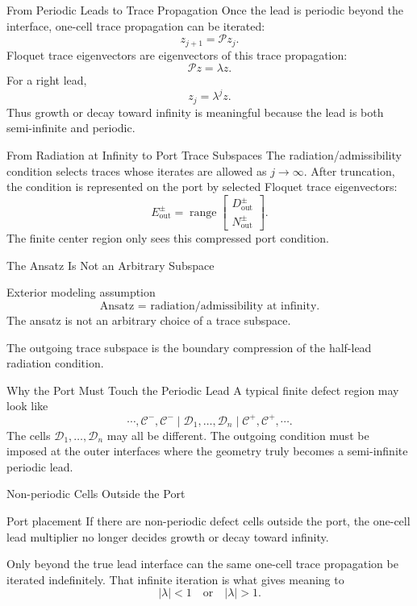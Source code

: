 \documentclass[aspectratio=169]{beamer}
\begin{document}
\begin{frame}{From Periodic Leads to Trace Propagation}
  Once the lead is periodic beyond the interface, one-cell trace propagation can be iterated:
  \[
    z_{j+1}=\mathcal P z_j.
  \]
  Floquet trace eigenvectors are eigenvectors of this trace propagation:
  \[
    \mathcal P z=\lambda z.
  \]
  For a right lead,
  \[
    z_j=\lambda^j z.
  \]
  Thus growth or decay toward infinity is meaningful because the lead is both semi-infinite and periodic.
\end{frame}

\begin{frame}{From Radiation at Infinity to Port Trace Subspaces}
  The radiation/admissibility condition selects traces whose iterates are allowed as \(j\to\infty\).
  After truncation, the condition is represented on the port by selected Floquet trace eigenvectors:
  \[
    E_{\mathrm{out}}^\pm
    =
    \operatorname{range}
    \begin{bmatrix}
      D_{\mathrm{out}}^\pm\\
      N_{\mathrm{out}}^\pm
    \end{bmatrix}.
  \]
  The finite center region only sees this compressed port condition.
\end{frame}

\begin{frame}{The Ansatz Is Not an Arbitrary Subspace}
  \begin{alertblock}{Exterior modeling assumption}
    \[
      \boxed{\text{Ansatz = radiation/admissibility at infinity.}}
    \]
    The ansatz is not an arbitrary choice of a trace subspace.
  \end{alertblock}
  The outgoing trace subspace is the boundary compression of the half-lead radiation condition.
\end{frame}

\begin{frame}{Why the Port Must Touch the Periodic Lead}
  A typical finite defect region may look like
  \[
    \cdots,\mathcal C^-,\mathcal C^-
    \mid
    \mathcal D_1,\ldots,\mathcal D_n
    \mid
    \mathcal C^+,\mathcal C^+,\cdots .
  \]
  The cells \(\mathcal D_1,\ldots,\mathcal D_n\) may all be different.
  The outgoing condition must be imposed at the outer interfaces where the geometry truly becomes a semi-infinite periodic lead.
\end{frame}

\begin{frame}{Non-periodic Cells Outside the Port}
  \begin{alertblock}{Port placement}
    If there are non-periodic defect cells outside the port, the one-cell lead multiplier no longer decides growth or decay toward infinity.
  \end{alertblock}
  Only beyond the true lead interface can the same one-cell trace propagation be iterated indefinitely.
  That infinite iteration is what gives meaning to
  \[
    |\lambda|<1
    \quad\text{or}\quad
    |\lambda|>1.
  \]
\end{frame}
\end{document}
